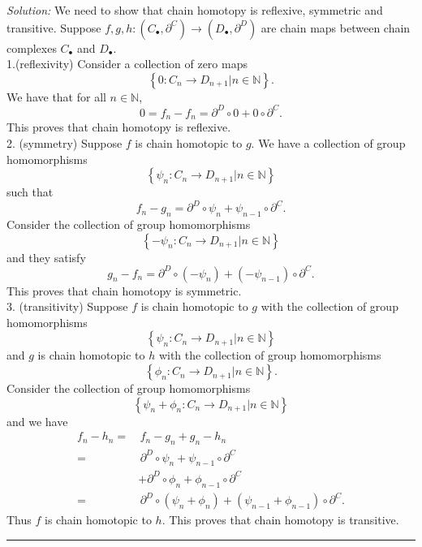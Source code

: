 \documentclass[a4paper, 11pt]{article}
\newenvironment{solution}
    {\textit{Solution:}}
    {}
\begin{document}
\begin{solution}
We need to show that chain homotopy is reflexive, symmetric and transitive. Suppose \(f,g,h:(C_\bullet,\partial^C) \rightarrow (D_\bullet,\partial^D)\) are chain maps between chain complexes 
\(C_\bullet\) and \(D_\bullet\). 
\\ 
1.(reflexivity) Consider a collection of zero maps 
$$\left\{ 0:C_n\rightarrow D_{n+1} | n\in \mathbb{N} \right\}.$$
We have that for all \(n\in \mathbb{N}\), 
$$0=f_n-f_n=\partial^D\circ 0+0\circ \partial^C.$$
This proves that chain homotopy is reflexive.
\\ 
2. (symmetry) Suppose \(f\) is chain homotopic to \(g\). We have a collection of group homomorphisms 
$$\left\{ \psi_n:C_n\rightarrow D_{n+1}|n\in \mathbb{N} \right\}$$
such that 
$$f_n-g_n=\partial^D\circ \psi_n+\psi_{n-1}\circ \partial^C.$$
Consider the collection of group homomorphisms
$$\left\{ -\psi_n:C_n\rightarrow D_{n+1}|n\in \mathbb{N} \right\}$$
and they satisfy 
$$g_n-f_n=\partial^D\circ (-\psi_n)+(-\psi_{n-1})\circ \partial^C.$$
This proves that chain homotopy is symmetric.
\\ 
3. (transitivity) Suppose \(f\) is chain homotopic to \(g\) with the collection of group homomorphisms 
$$\left\{ \psi_n:C_n\rightarrow D_{n+1}|n\in \mathbb{N} \right\}$$
and \(g\) is chain homotopic to \(h\) with the collection of group homomorphisms 
$$\left\{ \phi_n:C_n\rightarrow D_{n+1}|n\in \mathbb{N} \right\}.$$
Consider the collection of group homomorphisms
$$\left\{ \psi_n+\phi_n:C_n\rightarrow D_{n+1}|n\in \mathbb{N} \right\}$$
and we have 
\begin{align*}
    f_n-h_n = &\, f_n-g_n+g_n-h_n\\ 
            = &\, \partial^D\circ \psi_n+\psi_{n-1}\circ \partial^C\\ 
              & +\partial^D\circ \phi_n+\phi_{n-1}\circ \partial^C\\ 
            = &\, \partial^D\circ (\psi_n+\phi_n)+(\psi_{n-1}+\phi_{n-1})\circ \partial^C.
\end{align*}
Thus \(f\) is chain homotopic to \(h\). This proves that chain homotopy is transitive.
\end{solution}
\\  
\noindent\rule{7in}{2.8pt}
\end{document}

